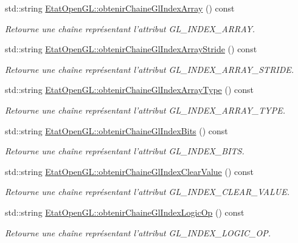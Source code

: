 \begin{DoxyCompactItemize}
std\-::string \hyperlink{group__utilitaire_ga63a264a046b4714154de9f26b04ab1f8}{Etat\-Open\-G\-L\-::obtenir\-Chaine\-Gl\-Index\-Array} () const 
\begin{DoxyCompactList}\small\item\em Retourne une chaîne représentant l'attribut G\-L\-\_\-\-I\-N\-D\-E\-X\-\_\-\-A\-R\-R\-A\-Y. \end{DoxyCompactList}\item 
std\-::string \hyperlink{group__utilitaire_ga79b9f3969a037a0ed02684b41a8a1328}{Etat\-Open\-G\-L\-::obtenir\-Chaine\-Gl\-Index\-Array\-Stride} () const 
\begin{DoxyCompactList}\small\item\em Retourne une chaîne représentant l'attribut G\-L\-\_\-\-I\-N\-D\-E\-X\-\_\-\-A\-R\-R\-A\-Y\-\_\-\-S\-T\-R\-I\-D\-E. \end{DoxyCompactList}\item 
std\-::string \hyperlink{group__utilitaire_ga8479c06a3ede7442505bb38803be818f}{Etat\-Open\-G\-L\-::obtenir\-Chaine\-Gl\-Index\-Array\-Type} () const 
\begin{DoxyCompactList}\small\item\em Retourne une chaîne représentant l'attribut G\-L\-\_\-\-I\-N\-D\-E\-X\-\_\-\-A\-R\-R\-A\-Y\-\_\-\-T\-Y\-P\-E. \end{DoxyCompactList}\item 
std\-::string \hyperlink{group__utilitaire_gae88fc4ca05d447c04f08671823a407a3}{Etat\-Open\-G\-L\-::obtenir\-Chaine\-Gl\-Index\-Bits} () const 
\begin{DoxyCompactList}\small\item\em Retourne une chaîne représentant l'attribut G\-L\-\_\-\-I\-N\-D\-E\-X\-\_\-\-B\-I\-T\-S. \end{DoxyCompactList}\item 
std\-::string \hyperlink{group__utilitaire_gad0d02a72c93d1501432001b500bf6435}{Etat\-Open\-G\-L\-::obtenir\-Chaine\-Gl\-Index\-Clear\-Value} () const 
\begin{DoxyCompactList}\small\item\em Retourne une chaîne représentant l'attribut G\-L\-\_\-\-I\-N\-D\-E\-X\-\_\-\-C\-L\-E\-A\-R\-\_\-\-V\-A\-L\-U\-E. \end{DoxyCompactList}\item 
std\-::string \hyperlink{group__utilitaire_ga5294ee67327c1a604fe1ac627d539acc}{Etat\-Open\-G\-L\-::obtenir\-Chaine\-Gl\-Index\-Logic\-Op} () const 
\begin{DoxyCompactList}\small\item\em Retourne une chaîne représentant l'attribut G\-L\-\_\-\-I\-N\-D\-E\-X\-\_\-\-L\-O\-G\-I\-C\-\_\-\-O\-P. \end{DoxyCompactList}\item 

\end{DoxyCompactItemize}
